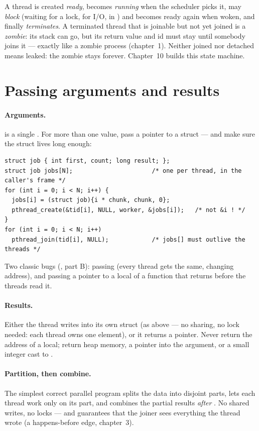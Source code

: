 A thread is created \emph{ready}, becomes \emph{running} when the
scheduler picks it, may \emph{block} (waiting for a lock, for I/O, in
) and becomes ready again when woken, and finally
\emph{terminates}. A terminated thread that is joinable but not yet
joined is a \emph{zombie}: its stack can go, but its return value and id
must stay until somebody joins it --- exactly like a zombie process
(chapter~1). Neither joined nor detached means leaked: the zombie stays
forever. Chapter~10 builds this state machine.

\section{Passing arguments and results}

\paragraph{Arguments.}  is a single . For more
than one value, pass a pointer to a struct --- and make sure the struct
lives long enough:

\begin{lstlisting}
struct job { int first, count; long result; };
struct job jobs[N];                      /* one per thread, in the caller's frame */
for (int i = 0; i < N; i++) {
  jobs[i] = (struct job){i * chunk, chunk, 0};
  pthread_create(&tid[i], NULL, worker, &jobs[i]);   /* not &i ! */
}
for (int i = 0; i < N; i++)
  pthread_join(tid[i], NULL);            /* jobs[] must outlive the threads */
\end{lstlisting}

Two classic bugs (, part B): passing  (every thread
gets the same, changing address), and passing a pointer to a local of a
function that returns before the threads read it.

\paragraph{Results.} Either the thread writes into its own struct (as
above --- no sharing, no lock needed: each thread owns one element), or it
returns a pointer. Never return the address of a local; return heap
memory, a pointer into the argument, or a small integer cast to
.

\paragraph{Partition, then combine.} The simplest correct parallel
program splits the data into disjoint parts, lets each thread work only
on its part, and combines the partial results \emph{after}
. No shared writes, no locks --- and
 guarantees that the joiner sees everything the
thread wrote (a happens-before edge, chapter~3).

